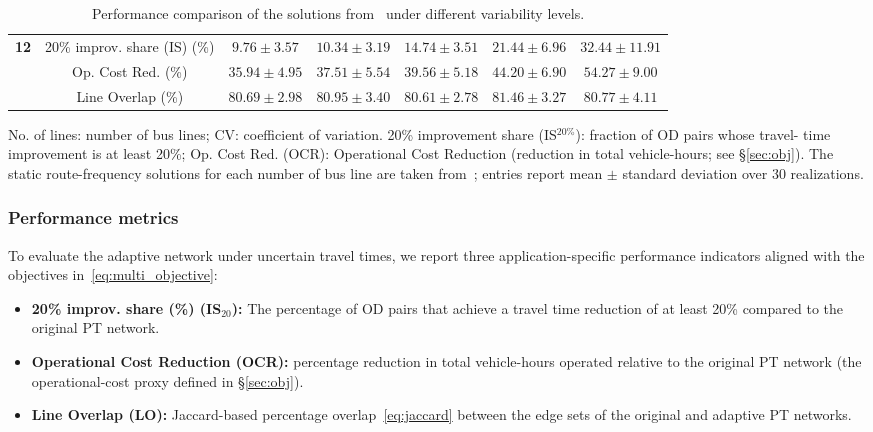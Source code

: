 \documentclass[a4paper,fleqn]{cas-sc}
\begin{document}
\begin{table}[pos=tbp]
\begin{threeparttable}
\begin{tabular*}{\textwidth}{@{\extracolsep{\fill}}ccccccc@{}}
\multirow{3}{*}{\textbf{12}}
& 20\% improv. share (IS) (\%)
& $9.76\pm3.57$ & $10.34\pm3.19$ & $14.74\pm3.51$
& $21.44\pm6.96$ & $32.44\pm11.91$ \\
& Op. Cost Red. (\%)
& $35.94\pm4.95$ & $37.51\pm5.54$ & $39.56\pm5.18$
& $44.20\pm6.90$ & $54.27\pm9.00$ \\
& Line Overlap (\%)
& $80.69\pm2.98$ & $80.95\pm3.40$ & $80.61\pm2.78$
& $81.46\pm3.27$ & $80.77\pm4.11$ \\

\bottomrule
\end{tabular*}

\begin{tablenotes}
\scriptsize
\item No. of lines: number of bus lines; CV: coefficient of variation.
20\% improvement share (IS$^{20\%}$): fraction of OD pairs whose travel-
time improvement is at least 20\%;
Op. Cost Red. (OCR): Operational Cost Reduction (reduction in total
vehicle-hours; see \S\ref{sec:obj}).
The static route-frequency solutions for each number of bus line are taken from~\citet{ahern2022approximate}; entries report mean $\pm$ standard deviation over 30 realizations.
\end{tablenotes}

\end{threeparttable}
\caption{Performance comparison of the solutions from~\citet{ahern2022approximate} under different variability levels.}
\label{tab:routeNumberCV}
\end{table}

\subsubsection{Performance metrics}
\label{sec:performMETRICS}

To evaluate the adaptive network under uncertain travel times, we report three
application-specific performance indicators aligned with the objectives
in~\eqref{eq:multi_objective}:

\begin{itemize}
    \item \textbf{20\% improv. share (\%) (IS$_{20}$):} The percentage of OD pairs that achieve a travel time reduction of at least 20\% compared to the original PT network.
    \item \textbf{Operational Cost Reduction (OCR):} percentage reduction in
    total vehicle-hours operated relative to the original PT network (the operational-cost proxy defined in \S\ref{sec:obj}).
    \item \textbf{Line Overlap (LO):} Jaccard-based percentage overlap~\eqref{eq:jaccard} between the edge sets of the original and adaptive PT networks.
\end{itemize}
\end{document}

